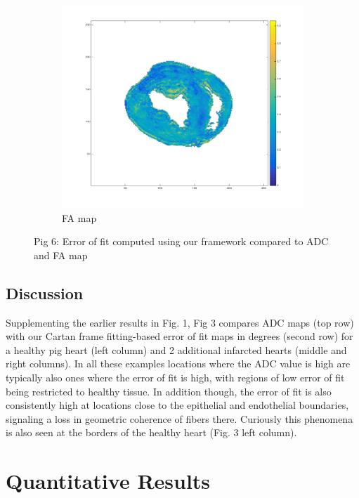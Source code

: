 \begin{figure}
    \begin{subfigure}{.31\textwidth}
        \includegraphics[width=\textwidth]{figures/pig6_fa_24}
        \caption{FA map}
        \label{fig:pig6_fa}
    \end{subfigure}
    \caption{Pig 6: Error of fit computed using our framework compared to ADC and FA map}
    \label{fig:pig6}
\end{figure}

\subsection{Discussion}

Supplementing the earlier results in Fig. 1, Fig 3 compares ADC maps (top row) with our Cartan frame fitting-based error of fit maps in degrees (second row) for a healthy pig heart (left column) and 2 additional infarcted hearts (middle and right columns). In all these examples locations where the ADC value is high are typically also ones where the error of fit is high, with regions of low error of fit being restricted to healthy tissue. In addition though, the error of fit is also consistently high at locations close to the epithelial and endothelial boundaries, signaling a loss in geometric coherence of fibers there. Curiously this phenomena is also seen at the borders of the healthy heart (Fig. 3 left column).

\section{Quantitative Results}

